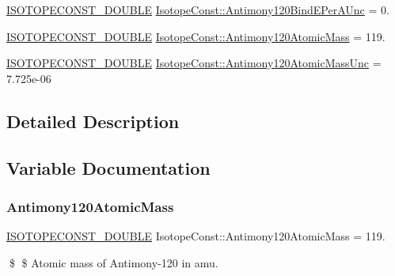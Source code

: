 \begin{DoxyCompactItemize}
\mbox{\hyperlink{group___isotope_const-_macros_ga8f45a7272ce02c0b4c65c44636ed719a}{I\+S\+O\+T\+O\+P\+E\+C\+O\+N\+S\+T\+\_\+\+D\+O\+U\+B\+LE}} \mbox{\hyperlink{group___isotope_const-_antimony-_sb120_gab239b4a67e753f288517e4c257c833ff}{Isotope\+Const\+::\+Antimony120\+Bind\+E\+Per\+A\+Unc}} = 0.
\item 
\mbox{\hyperlink{group___isotope_const-_macros_ga8f45a7272ce02c0b4c65c44636ed719a}{I\+S\+O\+T\+O\+P\+E\+C\+O\+N\+S\+T\+\_\+\+D\+O\+U\+B\+LE}} \mbox{\hyperlink{group___isotope_const-_antimony-_sb120_ga4b69456554dab7da0b3673b8383c2207}{Isotope\+Const\+::\+Antimony120\+Atomic\+Mass}} = 119.
\item 
\mbox{\hyperlink{group___isotope_const-_macros_ga8f45a7272ce02c0b4c65c44636ed719a}{I\+S\+O\+T\+O\+P\+E\+C\+O\+N\+S\+T\+\_\+\+D\+O\+U\+B\+LE}} \mbox{\hyperlink{group___isotope_const-_antimony-_sb120_ga25af6d625bfa52d32537d71cc0a01675}{Isotope\+Const\+::\+Antimony120\+Atomic\+Mass\+Unc}} = 7.\+725e-\/06
\end{DoxyCompactItemize}


\subsection{Detailed Description}


\subsection{Variable Documentation}
\mbox{\label{group___isotope_const-_antimony-_sb120_ga4b69456554dab7da0b3673b8383c2207}} 
\subsubsection{\texorpdfstring{Antimony120\+Atomic\+Mass}{Antimony120AtomicMass}}
{\footnotesize\ttfamily \mbox{\hyperlink{group___isotope_const-_macros_ga8f45a7272ce02c0b4c65c44636ed719a}{I\+S\+O\+T\+O\+P\+E\+C\+O\+N\+S\+T\+\_\+\+D\+O\+U\+B\+LE}} Isotope\+Const\+::\+Antimony120\+Atomic\+Mass = 119.}

\$ \$ Atomic mass of Antimony-\/120 in amu. \mbox{\label{group___isotope_const-_antimony-_sb120_ga25af6d625bfa52d32537d71cc0a01675}} 
